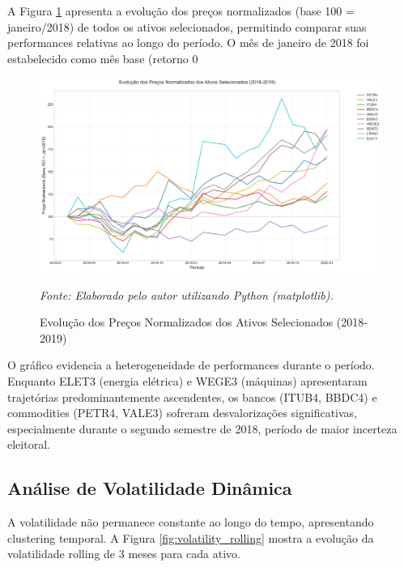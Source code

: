 A Figura \ref{fig:price_evolution} apresenta a evolução dos preços normalizados (base 100 = janeiro/2018) de todos os ativos selecionados, permitindo comparar suas performances relativas ao longo do período. O mês de janeiro de 2018 foi estabelecido como mês base (retorno 0%

\begin{figure}[H]
\centering
\includegraphics[width=\textwidth]{images/price_evolution.png}
\caption{Evolução dos Preços Normalizados dos Ativos Selecionados (2018-2019)}
\textit{Fonte: Elaborado pelo autor utilizando Python (matplotlib).}
\label{fig:price_evolution}
\end{figure}

O gráfico evidencia a heterogeneidade de performances durante o período. Enquanto ELET3 (energia elétrica) e WEGE3 (máquinas) apresentaram trajetórias predominantemente ascendentes, os bancos (ITUB4, BBDC4) e commodities (PETR4, VALE3) sofreram desvalorizações significativas, especialmente durante o segundo semestre de 2018, período de maior incerteza eleitoral.

\subsection{Análise de Volatilidade Dinâmica}

A volatilidade não permanece constante ao longo do tempo, apresentando clustering temporal. A Figura \ref{fig:volatility_rolling} mostra a evolução da volatilidade rolling de 3 meses para cada ativo.

